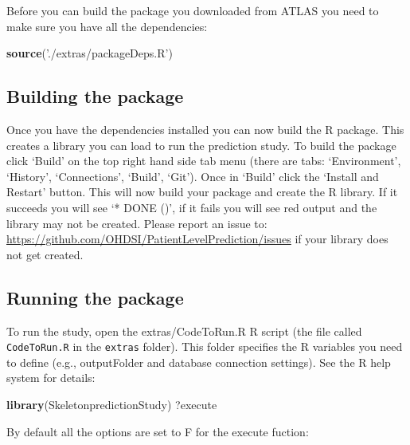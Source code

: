\documentclass[]{article}
\newenvironment{Shaded}{\begin{snugshade}}{\end{snugshade}}
\newcommand{\KeywordTok}[1]{\textcolor[rgb]{0.13,0.29,0.53}{\textbf{#1}}}
\newcommand{\StringTok}[1]{\textcolor[rgb]{0.31,0.60,0.02}{#1}}
\newcommand{\NormalTok}[1]{#1}
\begin{document}
Before you can build the package you downloaded from ATLAS you need to
make sure you have all the dependencies:

\begin{Shaded}
\begin{Highlighting}[]
\KeywordTok{source}\NormalTok{(}\StringTok{'./extras/packageDeps.R'}\NormalTok{)}
\end{Highlighting}
\end{Shaded}

\subsection{Building the package}\label{building-the-package}

Once you have the dependencies installed you can now build the R
package. This creates a library you can load to run the prediction
study. To build the package click `Build' on the top right hand side tab
menu (there are tabs: `Environment', `History', `Connections', `Build',
`Git'). Once in `Build' click the `Install and Restart' button. This
will now build your package and create the R library. If it succeeds you
will see `* DONE ()', if it fails you will see red output and the
library may not be created. Please report an issue to:
\url{https://github.com/OHDSI/PatientLevelPrediction/issues} if your
library does not get created.

\subsection{Running the package}\label{running-the-package}

To run the study, open the extras/CodeToRun.R R script (the file called
\texttt{CodeToRun.R} in the \texttt{extras} folder). This folder
specifies the R variables you need to define (e.g., outputFolder and
database connection settings). See the R help system for details:

\begin{Shaded}
\begin{Highlighting}[]
\KeywordTok{library}\NormalTok{(SkeletonpredictionStudy)}
\NormalTok{?execute}
\end{Highlighting}
\end{Shaded}

By default all the options are set to F for the execute fuction:
\end{document}
